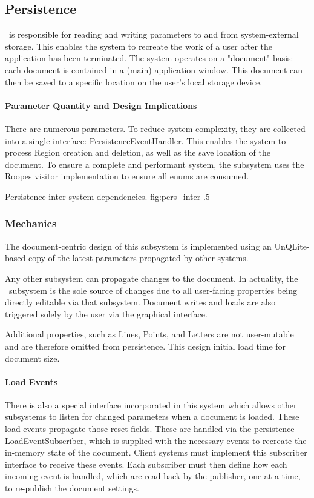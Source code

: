 \subsection{Persistence}
\permod\ is responsible for reading and writing parameters to and from system-external storage.
This enables the system to recreate the work of a user after the application has been terminated.
The system operates on a "document" basis: each document is contained in a (main) application window.
This document can then be saved to a specific location on the user's local storage device.

\paragraph{Parameter Quantity and Design Implications}
There are numerous parameters.
To reduce system complexity, they are collected into a single interface: PersistenceEventHandler.
This enables the system to process Region creation and deletion, as well as the save location of the document.
To ensure a complete and performant system, the subsystem uses the Roopes visitor implementation to ensure all enums are consumed.

{Persistence inter-system dependencies.}
{fig:pers_inter}
{.5}


\subsubsection{Mechanics}
The document-centric design of this subsystem is implemented using an UnQLite-based copy of the latest parameters propagated by other systems.

Any other subsystem can propagate changes to the document.
In actuality, the \uimod\ subsystem is the sole source of changes due to all user-facing properties being directly editable via that subsystem.
Document writes and loads are also triggered solely by the user via the graphical interface.

Additional properties, such as Lines, Points, and Letters are not user-mutable and are therefore omitted from persistence.
This design initial load time for document size.

\paragraph{Load Events}
{
      There is also a special interface incorporated in this system which allows other subsystems to listen for changed parameters when a document is loaded.
      These load events propagate those reset fields.
      These are handled via the persistence LoadEventSubscriber, which is supplied with the necessary events to recreate the in-memory state of the document.
      Client systems must implement this subscriber interface to receive these events.
      Each subscriber must then define how each incoming event is handled, which are read back by the publisher, one at a time, to re-publish the document settings.
}

